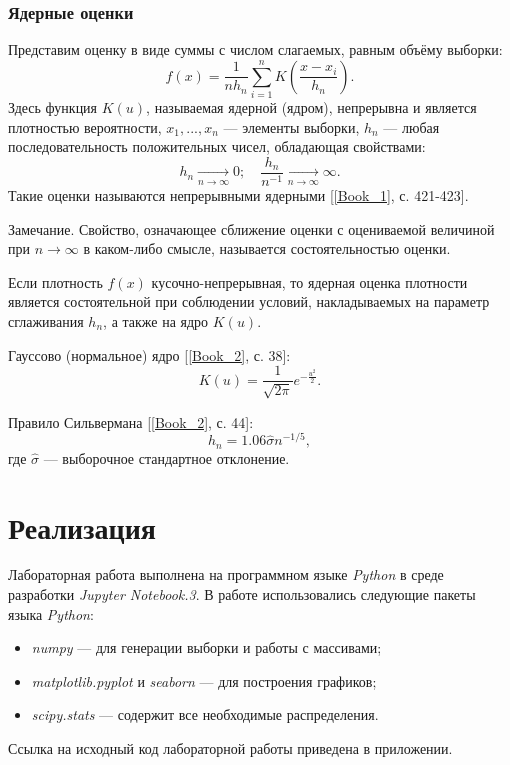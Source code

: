 \documentclass[12pt,a4paper]{article}
\begin{document}
	\subsubsection{Ядерные оценки}
		Представим оценку в виде суммы с числом слагаемых, равным объёму выборки:
		\begin{equation}\label{eqn:pdf_sum}
			\hat{f}(x) = \frac{1}{nh_n}\sum_{i=1}^{n}K(\frac{x-x_i}{h_n}).
		\end{equation}
		Здесь функция $K(u)$, называемая ядерной (ядром), непрерывна и является плотностью вероятности, $x_1, ... ,x_n$ --- элементы выборки, ${h_n}$ --- любая последовательность положительных чисел, обладающая свойствами:
		\begin{equation}\label{eqn:h cond}
			h_n \xrightarrow[n\rightarrow\infty]{}0; \quad \frac{h_n}{n^{-1}}\xrightarrow[n\rightarrow\infty]{}\infty.
		\end{equation}
		Такие оценки называются непрерывными ядерными [\ref{Book_1}, с. 421-423].
		
		Замечание. Свойство, означающее сближение оценки с оцениваемой величиной при $n\rightarrow\infty$ в каком-либо смысле, называется состоятельностью оценки. 
		
		Если плотность $f(x)$ кусочно-непрерывная, то ядерная оценка плотности является состоятельной при соблюдении условий, накладываемых на параметр сглаживания $h_n$, а также на ядро $K(u)$.
		
		Гауссово (нормальное) ядро [\ref{Book_2}, с. 38]:
		\begin{equation}\label{eqn:Kernel fun}
			K(u)=\frac{1}{\sqrt{2\pi}}e^{-\frac{u^2}{2}}.
		\end{equation}
		
		Правило Сильвермана [\ref{Book_2}, с. 44]:
		\begin{equation}\label{eqn:Silverman rule}
		h_n = 1.06\hat{\sigma}n^{-1/5},
		\end{equation}
		где $\hat{\sigma}$ --- выборочное стандартное отклонение.
	\section{Реализация}
		Лабораторная работа выполнена на программном языке \emph{Python} в среде разработки \emph{Jupyter Notebook.3}. В работе использовались следующие пакеты языка \emph{Python}:
		\begin{itemize}
			\item \emph{numpy} --- для генерации выборки и работы с массивами;
			
			\item \emph{matplotlib.pyplot} и \emph{seaborn} --- для построения графиков;
			
			\item \emph{scipy.stats} --- содержит все необходимые распределения.
		\end{itemize}
		Ссылка на исходный код лабораторной работы приведена в приложении.
\end{document}
